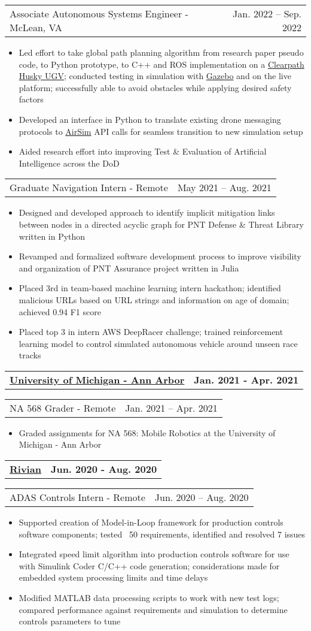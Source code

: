 \documentclass[letterpaper,11pt]{article}
\makeatletter
\newcommand{\resumeItem}[1]{
	\item\small{
		#1
	}
}
\newcommand{\resumeCompanyHeading}[2]{
  \vspace{-1pt}\item
    \begin{tabular*}{0.97\textwidth}[t]{l@{\extracolsep{\fill}}r}
      \textbf{#1} & \textbf{#2} \\
    \end{tabular*}\vspace{-0pt}
}
\newcommand{\resumeJobHeading}[3]{
	\vspace{-1pt}
	\begin{tabular*}{0.97\textwidth}[t]{l@{\extracolsep{\fill}}r}
		{\small#1} - {\small #2} & {\small #3} \\
	\end{tabular*}\vspace{-4pt}
}
\newcommand{\resumeItemListStart}{\begin{itemize}}
\newcommand{\resumeItemListEnd}{\end{itemize}\vspace{-4pt}}
\makeatother
\begin{document}
\resumeJobHeading{Associate Autonomous Systems Engineer}{McLean, VA}{Jan. 2022 -- Sep. 2022}
\resumeItemListStart
\resumeItem{Led effort to take global path planning algorithm from research paper pseudo code, to Python prototype, to C++ and ROS implementation on a \href{https://clearpathrobotics.com/husky-unmanned-ground-vehicle-robot/}{Clearpath Husky UGV}; conducted testing in simulation with \href{https://gazebosim.org/home}{Gazebo} and on the live platform; successfully able to avoid obstacles while applying desired safety factors}
\resumeItem{Developed an interface in Python to translate existing drone messaging protocols to \href{https://microsoft.github.io/AirSim/}{AirSim} API calls for seamless transition to new simulation setup}
\resumeItem{Aided research effort into improving Test \& Evaluation of Artificial Intelligence across the DoD}
\resumeItemListEnd

\resumeJobHeading{Graduate Navigation Intern}{Remote}{May 2021 -- Aug. 2021}
\resumeItemListStart
\resumeItem{Designed and developed approach to identify implicit mitigation links between nodes in a directed acyclic graph for PNT Defense \& Threat Library written in Python}
\resumeItem{Revamped and formalized software development process to improve visibility and organization of PNT Assurance project written in Julia}
\resumeItem{Placed 3rd in team-based machine learning intern hackathon; identified malicious URLs based on URL strings and information on age of domain; achieved 0.94 F1 score}
\resumeItem{Placed top 3 in intern AWS DeepRacer challenge; trained reinforcement learning model to control simulated autonomous vehicle around unseen race tracks}
\resumeItemListEnd

\resumeCompanyHeading{\href{https://umich.edu/}{University of Michigan - Ann Arbor}}{Jan. 2021 - Apr. 2021}
\resumeJobHeading{NA 568 Grader}{Remote}{Jan. 2021 -- Apr. 2021}
\resumeItemListStart
\resumeItem{Graded assignments for NA 568: Mobile Robotics at the University of Michigan - Ann Arbor}
\resumeItemListEnd

\resumeCompanyHeading{\href{https://rivian.com/}{Rivian}}{Jun. 2020 - Aug. 2020}
\resumeJobHeading{ADAS Controls Intern}{Remote}{Jun. 2020 -- Aug. 2020}
\resumeItemListStart
\resumeItem{Supported creation of Model-in-Loop framework for production controls software components; tested ~50 requirements, identified and resolved 7 issues}
\resumeItem{Integrated speed limit algorithm into production controls software for use with Simulink Coder C/C++ code generation; considerations made for embedded system processing limits and time delays}
\resumeItem{Modified MATLAB data processing scripts to work with new test logs; compared performance against requirements and simulation to determine controls parameters to tune}
\resumeItemListEnd
\end{document}
